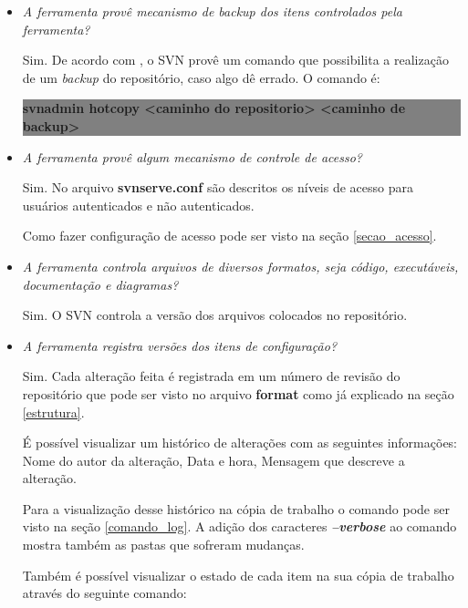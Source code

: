 \begin{itemize}
  \item \textit{A ferramenta provê mecanismo de backup dos itens controlados pela ferramenta?}

    Sim. De acordo com , o SVN provê um comando que possibilita a realização de um \textit{backup} do repositório, caso algo dê errado. O comando é:

    \begin{centering}
    \colorbox{Gray}{
    \begin{minipage}{420px}
      \textbf{svnadmin hotcopy <caminho do repositorio> <caminho de backup>}
    \end{minipage}
    }

    \end{centering}

  \item \textit{A ferramenta provê algum mecanismo de controle de acesso?}

    Sim. No arquivo \textbf{svnserve.conf} são descritos os níveis de acesso para usuários autenticados e não autenticados.\cite{svn-book}

    Como fazer configuração de acesso pode ser visto na seção \ref{secao_acesso}.
  \item \textit{A ferramenta controla arquivos de diversos formatos, seja código, executáveis, documentação e diagramas?}

    Sim. O SVN controla a versão dos arquivos colocados no repositório.

  \item \textit{A ferramenta registra versões dos itens de configuração?}

    Sim. Cada alteração feita é registrada em um número de revisão do repositório que pode ser visto no arquivo \textbf{format} como já explicado na seção \ref{estrutura}.

    É possível visualizar um histórico de alterações com as seguintes informações: Nome do autor da alteração, Data e hora, Mensagem que descreve a alteração. \cite{svn-book}

    Para a visualização desse histórico na cópia de trabalho o comando pode ser visto na seção \ref{comando_log}. A adição dos caracteres \textbf{\textit{--verbose}} ao comando mostra também as pastas que sofreram mudanças.

    Também é possível visualizar o estado de cada item na sua cópia de trabalho através do seguinte comando: \cite{svn-book}


\end{itemize}
